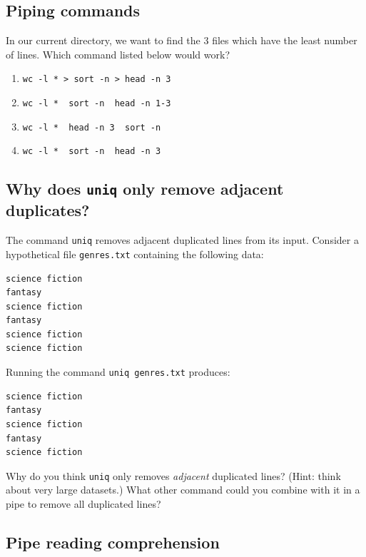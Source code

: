 \documentclass[
]{krantz}
\providecommand{\tightlist}{%
  \setlength{\itemsep}{0pt}\setlength{\parskip}{0pt}}
\begin{document}
\hypertarget{bash-tools-ex-piping}{%
\subsection{Piping commands}\label{bash-tools-ex-piping}}

In our current directory, we want to find the 3 files which have the least number of
lines. Which command listed below would work?

\begin{enumerate}
\def\labelenumi{\arabic{enumi}.}
\tightlist
\item
  \texttt{wc\ -l\ *\ \textgreater{}\ sort\ -n\ \textgreater{}\ head\ -n\ 3}
\item
  \texttt{wc\ -l\ *\ \textbar{}\ sort\ -n\ \textbar{}\ head\ -n\ 1-3}
\item
  \texttt{wc\ -l\ *\ \textbar{}\ head\ -n\ 3\ \textbar{}\ sort\ -n}
\item
  \texttt{wc\ -l\ *\ \textbar{}\ sort\ -n\ \textbar{}\ head\ -n\ 3}
\end{enumerate}

\hypertarget{bash-tools-ex-uniq-adjacent}{%
\subsection{\texorpdfstring{Why does \texttt{uniq} only remove adjacent duplicates?}{Why does uniq only remove adjacent duplicates?}}\label{bash-tools-ex-uniq-adjacent}}

The command \texttt{uniq} removes adjacent duplicated lines from its input.
Consider a hypothetical file \texttt{genres.txt} containing the following data:

\begin{verbatim}
science fiction
fantasy
science fiction
fantasy
science fiction
science fiction
\end{verbatim}

Running the command \texttt{uniq\ genres.txt} produces:

\begin{verbatim}
science fiction
fantasy
science fiction
fantasy
science fiction
\end{verbatim}

Why do you think \texttt{uniq} only removes \emph{adjacent} duplicated lines?
(Hint: think about very large datasets.) What other command could
you combine with it in a pipe to remove all duplicated lines?

\hypertarget{bash-tools-ex-reading-pipes}{%
\subsection{Pipe reading comprehension}\label{bash-tools-ex-reading-pipes}}
\end{document}
